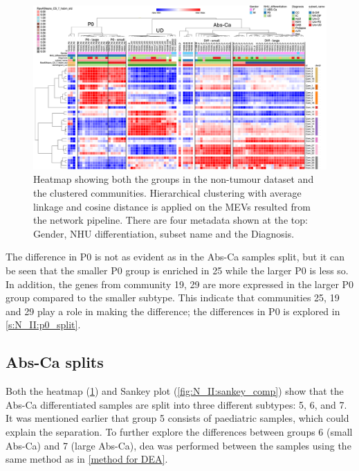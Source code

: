 \begin{figure}
    \includegraphics[width=1.0\textwidth,height=1.0\textheight,keepaspectratio]{Sections/Network_II/resources/non_tum/rotated_healthy_std_3.1.png}

    \caption{Heatmap showing both the groups in the non-tumour dataset and the clustered communities. Hierarchical clustering with average linkage and cosine distance is applied on the MEVs resulted from the network pipeline. There are four metadata shown at the top: Gender, NHU differentiation, subset name and the Diagnosis. }
    \label{fig:N_II:morph_non_tum}
\end{figure}


The difference in P0 is not as evident as in the Abs-Ca samples split, but it can be seen that the smaller P0 group is enriched in 25 while the larger P0 is less so. In addition, the genes from community 19, 29 are more expressed in the larger P0 group compared to the smaller subtype. This indicate that communities 25, 19 and 29 play a role in making the difference; the differences in P0 is explored in \cref{s:N_II:p0_split}.

\subsection{Abs-Ca splits} \label{s:N_II:diff_split}

Both the heatmap (\cref{fig:N_II:morph_non_tum}) and Sankey plot (\cref{fig:N_II:sankey_comp}) show that the Abs-Ca differentiated samples are split into three different subtypes: 5, 6, and 7. It was mentioned earlier that group 5 consists of paediatric samples, which could explain the separation. To further explore the differences between groups 6 (small Abs-Ca) and 7 (large Abs-Ca), \acrfull{dea} was performed between the samples using the same method as in \cref{method for DEA}.


